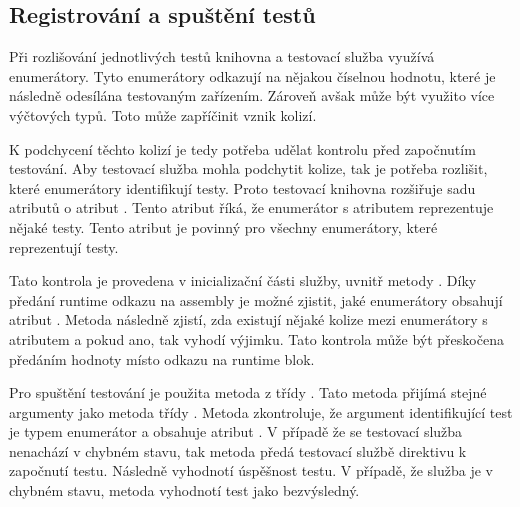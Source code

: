 \subsection{Registrování a spuštění testů}

Při rozlišování jednotlivých testů knihovna a testovací služba využívá enumerátory. Tyto enumerátory odkazují na nějakou číselnou hodnotu, které je následně odesílána testovaným zařízením. Zároveň avšak může být využito více výčtových typů. Toto může zapříčinit vznik kolizí. 

K podchycení těchto kolizí je tedy potřeba udělat kontrolu před započnutím testování. Aby testovací služba mohla podchytit kolize, tak je potřeba rozlišit, které enumerátory identifikují testy. Proto testovací knihovna rozšiřuje sadu atributů o atribut . Tento atribut říká, že enumerátor s atributem  reprezentuje nějaké testy. Tento atribut je povinný pro všechny enumerátory, které reprezentují testy.

Tato kontrola je provedena v inicializační části služby, uvnitř metody . Díky předání runtime odkazu na assembly je možné zjistit, jaké enumerátory obsahují atribut . Metoda následně zjistí, zda existují nějaké kolize mezi enumerátory s atributem  a pokud ano, tak vyhodí výjimku. Tato kontrola může být přeskočena předáním hodnoty  místo odkazu na runtime blok. 

Pro spuštění testování je použita metoda  z třídy . Tato metoda přijímá stejné argumenty jako metoda  třídy . Metoda zkontroluje, že argument identifikující test je typem enumerátor a obsahuje atribut . V případě že se testovací služba nenachází v chybném stavu, tak metoda předá testovací službě direktivu k započnutí testu. Následně vyhodnotí úspěšnost testu. V případě, že služba je v chybném stavu, metoda vyhodnotí test jako bezvýsledný.

